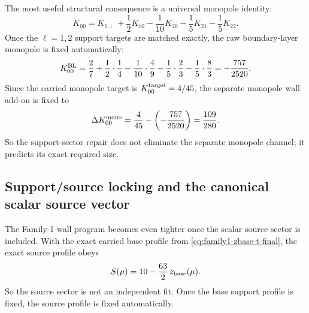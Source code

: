 \documentclass[11pt]{article}
\begin{document}
The most useful structural consequence is a universal monopole identity:
\begin{equation}
K_{00}
=
K_{1\perp}+\frac12K_{10}-\frac1{10}K_{20}-\frac15K_{21}-\frac15K_{22}.
\label{eq:family1-universal-monopole-identity}
\end{equation}
Once the \(\ell=1,2\) support targets are matched exactly, the raw boundary-layer
monopole is fixed automatically:
\begin{equation}
K_{00}^{\rm BL}
=
\frac27+\frac12\cdot\frac14-\frac1{10}\cdot\frac49-\frac15\cdot\frac23
-\frac15\cdot\frac83
=-\frac{757}{2520}.
\label{eq:family1-K00BL}
\end{equation}
Since the carried monopole target is \(K_{00}^{\rm target}=4/45\), the separate
monopole wall add-on is fixed to
\begin{equation}
\Delta K_{00}^{\rm mono}
=
\frac{4}{45}-\left(-\frac{757}{2520}\right)
=
\frac{109}{280}.
\label{eq:family1-monopole-deficit}
\end{equation}
So the support-sector repair does not eliminate the separate monopole channel; it predicts
its exact required size.

\subsection{Support/source locking and the canonical scalar source vector}
\label{app:family1-source-lock}

The Family-1 wall program becomes even tighter once the scalar source sector is included.
With the exact carried base profile from \cref{eq:family1-zbase-t-final}, the exact
source profile obeys
\begin{equation}
S(\mu)=10-\frac{63}{2}\,z_{\rm base}(\mu).
\label{eq:family1-source-from-zbase}
\end{equation}
So the source sector is not an independent fit.  Once the base support profile is fixed,
the source profile is fixed automatically.
\end{document}
